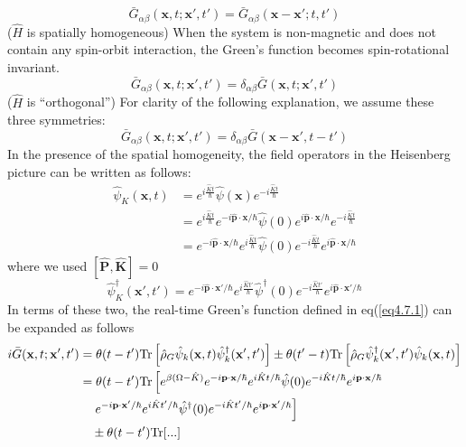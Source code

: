 \begin{equation}
\bar{G}_{\alpha\beta}(\mathbf{x},t;\mathbf{x}',t')=\bar{G}_{\alpha\beta}(\mathbf{x}-\mathbf{x}';t,t')
\end{equation}
($\hat{H}$ is spatially homogeneous)
 When the system is non-magnetic and does not contain any spin-orbit interaction, the Green's function becomes spin-rotational invariant.
\begin{equation}
\bar{G}_{\alpha\beta}(\mathbf{x},t;\mathbf{x}',t')=\delta_{\alpha\beta}\bar{G}(\mathbf{x},t;\mathbf{x}',t')
\end{equation}
($\hat{H}$ is ``orthogonal'')
 For clarity of the following explanation, we assume these three symmetries:
\begin{equation}
\bar{G}_{\alpha\beta}(\mathbf{x},t;\mathbf{x}',t')=\delta_{\alpha\beta}\bar{G}(\mathbf{x}-\mathbf{x}',t-t')
\end{equation}
 In the presence of the spatial homogeneity, the field operators in the Heisenberg picture can be written as follows:
\[
\begin{aligned}
\hat{\psi}_K(\mathbf{x},t)&=e^{i\frac{\hat{K}t}{\hbar}} \hat{\psi} (\mathbf{x}) e^{-i\frac{\hat{K}t}{\hbar}}\\
&=e^{i\frac{\hat{K}t}{\hbar}} e^{-i\hat{\mathbf{p}} \cdot \mathbf{x}/\hbar} \hat{\psi}(0) e^{i\hat{\mathbf{p}} \cdot \mathbf{x}/\hbar}  e^{-i\frac{\hat{K}t}{\hbar}}\\
&= e^{-i\hat{\mathbf{p}}  \cdot \mathbf{x}/\hbar}e^{i\frac{\hat{K}t}{\hbar}} \hat{\psi}(0)  e^{-i\frac{\hat{K}t}{\hbar}} e^{i\hat{\mathbf{p}} \cdot \mathbf{x}/\hbar}
\end{aligned}
\]
where we used $[\hat{\mathbf P},\hat{ \mathbf K}]=0$
\[
\hat{\psi}_K^\dag(\mathbf{x}',t')= e^{-i\hat{\mathbf{p}}  \cdot \mathbf{x}'/\hbar}e^{i\frac{\hat{K}t'}{\hbar}} \hat{\psi}^\dag(0)  e^{-i\frac{\hat{K}t'}{\hbar}} e^{i\hat{\mathbf{p}} \cdot \mathbf{x}'/\hbar}
\]
In terms of these two, the real-time Green's function defined in eq(\ref{eq4.7.1}) can be expanded as follows
\[
\begin{aligned}
i\bar{G}(\mathbf{x},t;\mathbf{x}',t')&=\theta(t-t')\text{Tr} \left[ \hat{\rho}_G \hat{\psi}_k(\mathbf{x},t) \hat{\psi}_k^\dag(\mathbf{x}',t')\right] \pm \theta(t'-t)\text{Tr} \left[ \hat{\rho}_G\hat{\psi}_k^\dag(\mathbf{x}',t') \hat{\psi}_k(\mathbf{x},t) \right] \\
&=\theta(t-t') \text{Tr} \left[ e^{\beta(\Omega-\hat K)} e^{-i\mathbf{p} \cdot \mathbf{x} /\hbar} e^{i\hat K t/\hbar} \hat \psi (0) e^{-i\hat K t/\hbar} e^{i\mathbf{p} \cdot \mathbf{x} /\hbar} \right.\\
&\left.\quad e^{-i\mathbf{p} \cdot \mathbf{x}' /\hbar}  e^{i\hat K t'/\hbar} \hat  \psi ^\dag(0) e^{-i\hat K t'/\hbar} e^{i\mathbf{p} \cdot \mathbf{x}' /\hbar} \right]\\
&\quad \pm\theta(t-t') \text{Tr}[...]
\end{aligned}
\]

